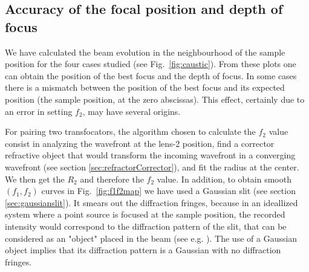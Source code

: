 \documentclass{iucr}              %
\newcommand{\inblue}[1]{{\color{blue}#1}}
\begin{document}

\subsection{Accuracy of the focal position and depth of focus}
\label{sec:caustic}

We have calculated the beam evolution in the neighbourhood of the sample position for the four cases studied (see Fig.~\ref{fig:caustic}). From these plots one can obtain the position of the best focus and the depth of focus. In some cases there is a mismatch between the position of the best focus and its expected position (the sample position, at the zero abscissas). This effect, certainly due to an error in setting $f_2$, may have several origins. 

For pairing two transfocators, the algorithm chosen to calculate the $f_2$ value consist in analyzing the wavefront at the lens-2 position, find a corrector refractive object that would transform the incoming wavefront in a converging wavefront (see section \ref{sec:refractorCorrector}), and fit the radius at the center. We then get the $R_2$ and therefore the $f_2$ value. In addition, to obtain smooth $(f_1,f_2)$ curves in Fig.~\ref{fig:f1f2map} we have used a Gaussian slit (see section \ref{sec:gaussianslit}). It smears out the diffraction fringes, because in an ideallized system where a point source is focused at the sample position, the recorded intensity would correspond to the diffraction pattern of the slit, that can be considered as an "object" placed in the beam (see e.g. \cite{paganin_book}). The use of a Gaussian object implies that its diffraction pattern is a Gaussian with no diffraction fringes. 
\end{document}
